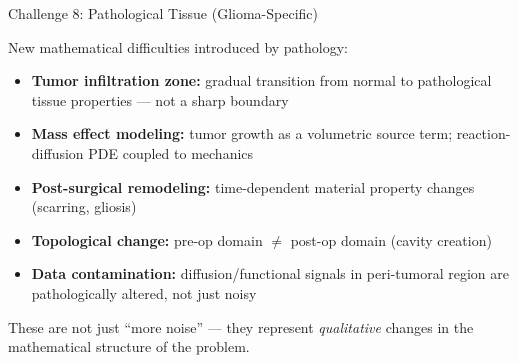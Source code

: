 \begin{frame}{Challenge 8: Pathological Tissue (Glioma-Specific)}

  New mathematical difficulties introduced by pathology:

  \bigskip

  \begin{itemize}
    \item \textbf{Tumor infiltration zone:} gradual transition from
      normal to pathological tissue properties --- not a sharp boundary
    \item \textbf{Mass effect modeling:} tumor growth as a volumetric
      source term; reaction-diffusion PDE coupled to mechanics
      \cite{Hormuth2021}
    \item \textbf{Post-surgical remodeling:} time-dependent material
      property changes (scarring, gliosis)
    \item \textbf{Topological change:} pre-op domain $\neq$ post-op
      domain (cavity creation)
    \item \textbf{Data contamination:} diffusion/functional signals in
      peri-tumoral region are pathologically altered, not just noisy
  \end{itemize}

  \bigskip

  These are not just ``more noise'' --- they represent \emph{qualitative}
  changes in the mathematical structure of the problem.

\end{frame}
